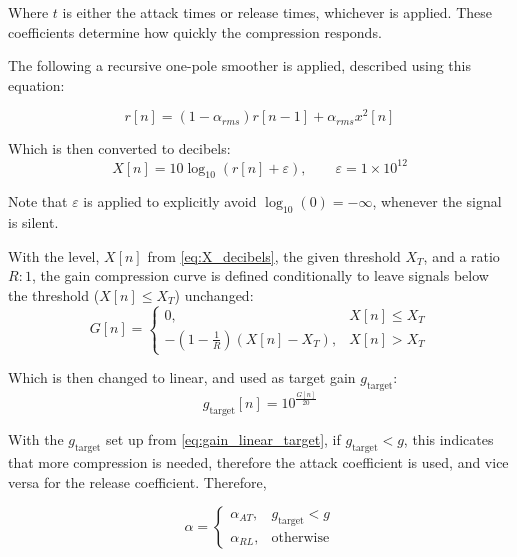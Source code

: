 Where $t$ is either the attack times or release times, whichever is applied. These coefficients
determine how quickly the compression responds.

The following a recursive one-pole smoother is applied, described
using this equation:

\begin{equation}\label{eq:first_smoother}
    r[n] = (1 - \alpha_{rms}) r[n-1] + \alpha_{rms} x^2 [n]
\end{equation}

Which is then converted to decibels:
\begin{equation}\label{eq:X_decibels}
    X[n] = 10 \log_{10}(r[n] + \varepsilon), \qquad \varepsilon = 1 \times 10^{12}
\end{equation}

Note that $\varepsilon$ is applied to explicitly avoid $\log_{10}(0) = -\infty$, whenever the signal is silent.

With the level, $X[n]$ from \eqref{eq:X_decibels}, the given threshold $X_T$, and a ratio $R : 1$,
the gain compression curve is defined conditionally to leave signals below the threshold ($X[n] \le X_T$) 
unchanged:
\begin{equation}\label{eq:gain_equation}
    G[n] =
    \begin{cases}
        0, & X[n] \le X_T \\
        -\left(1 - \frac{1}{R} \right) \left( X[n] - X_T \right), & X[n] > X_T
    \end{cases}
\end{equation}

Which is then changed to linear, and used as target gain $g_{\text{target}}$:
\begin{equation}\label{eq:gain_linear_target}
    g_{\text{target}}[n] = 10^\frac{G[n]}{20}
\end{equation}


With the $g_{\text{target}}$ set up from \eqref{eq:gain_linear_target}, if 
$g_{\text{target}} < g$, this indicates that more compression is needed, therefore the
attack coefficient is used, and vice versa for the release coefficient. Therefore,

\begin{equation}\label{eq:attack_or_release}
    \alpha =
    \begin{cases}
        \alpha_{AT}, & g_{\text{target}} < g \\
        \alpha_{RL}, & \text{otherwise}
    \end{cases}
\end{equation}

